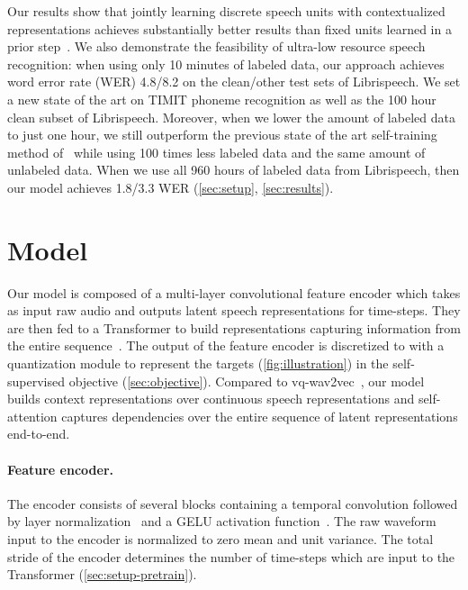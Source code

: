 \documentclass{article}
\newcommand{\libri}{Librispeech}
\begin{document}
Our results show that jointly learning discrete speech units with contextualized representations achieves substantially better results than fixed units learned in a prior step~\cite{baevski2019effectiveness}.
We also demonstrate the feasibility of ultra-low resource speech recognition: 
when using only 10 minutes of labeled data, our approach achieves word error rate (WER) 4.8/8.2 on the clean/other test sets of \libri{}.
We set a new state of the art on TIMIT phoneme recognition as well as the 100 hour clean subset of \libri{}. 
Moreover, when we lower the amount of labeled data to just one hour, we still outperform the previous state of the art self-training method of~\citep{park2020improved} while using 100 times less labeled data and the same amount of unlabeled data.
When we use all 960 hours of labeled data from \libri{}, then our model achieves 1.8/3.3 WER (\autoref{sec:setup}, \autoref{sec:results}).


\section{Model}
\label{sec:model}

Our model is composed of a multi-layer convolutional feature encoder  which takes as input raw audio  and outputs latent speech representations  for  time-steps. 
They are then fed to a Transformer  to build representations  capturing  information from the entire sequence~\cite{devlin2018bert,baevski2019vqwav2vec,baevski2019effectiveness}.
The output of the feature encoder is discretized to  with a quantization module  to represent the targets (\autoref{fig:illustration}) in the self-supervised objective (\autoref{sec:objective}).
Compared to vq-wav2vec~\citep{baevski2019vqwav2vec}, our model builds context representations over continuous speech representations and self-attention captures dependencies over the entire sequence of latent representations end-to-end.

\paragraph{Feature encoder.} 
The encoder consists of several blocks containing a temporal convolution followed by layer normalization~\citep{ba2016layer} and a GELU activation function~\citep{hendrycks2016gaussian}.
The raw waveform input to the encoder is normalized to zero mean and unit variance.
The total stride of the encoder determines the number of time-steps  which are input to the Transformer (\autoref{sec:setup-pretrain}).
\end{document}
